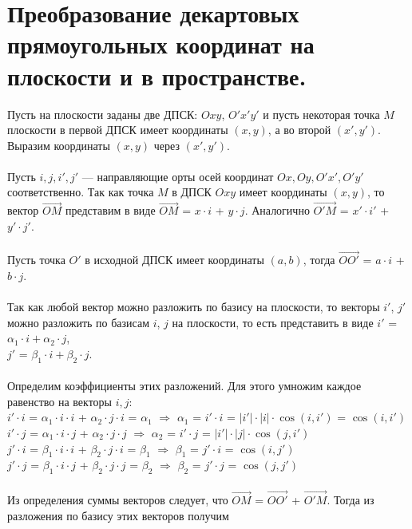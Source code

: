\section{Преобразование декартовых прямоугольных координат на плоскости и в пространстве.}
Пусть на плоскости заданы две ДПСК: $Oxy$, $O'x'y'$ и пусть некоторая точка $M$ плоскости в первой ДПСК имеет координаты $(x, y)$, а во второй $(x', y')$. Выразим координаты $(x, y)$ через $(x', y')$. \\\\Пусть $i, j, i', j'$ --- направляющие орты осей координат $Ox, Oy, O'x', O'y'$ соответственно. Так как точка $M$ в ДПСК $Oxy$ имеет координаты $(x, y)$, то вектор $\overrightarrow{OM}$ представим в виде $\overrightarrow{OM}$ = $x \cdot i$ + $y \cdot j$.
Аналогично $\overrightarrow{O' M}$ = $x' \cdot i'$ + $y' \cdot j'$. \\\\
Пусть точка $O'$ в исходной ДПСК имеет координаты $(a, b)$, тогда $\overrightarrow{O O'}$ = $a \cdot i$ + $b \cdot j$. \\\\
Так как любой вектор можно разложить по базису на плоскости, то векторы $i'$, $j'$ можно разложить по базисам $i$, $j$ на плоскости, то есть представить в виде $i'$ = $\alpha_1 \cdot i + \alpha_2 \cdot j$, \\ $j'$ = $\beta_1 \cdot i + \beta_2 \cdot j$. \\\\Определим коэффициенты этих разложений. Для этого умножим каждое равенство на векторы $i, j$: \\
$i'\cdot i$ = $\alpha_1 \cdot i \cdot i$ + $\alpha_2 \cdot j \cdot i$ = $\alpha_1$ $\Rightarrow$ $\alpha_1$ = $i' \cdot i$ = $|i'| \cdot |i| \cdot \cos(i, i')$ = $\cos(i, i')$ \\
$i' \cdot j$ = $\alpha_1 \cdot i \cdot j$ + $\alpha_2 \cdot j \cdot j$ $\Rightarrow$ $\alpha_2$ = $i' \cdot j$ = $|i'| \cdot |j| \cdot \cos(j, i')$ \\
$j' \cdot i$ = $\beta_1 \cdot i \cdot i$ + $\beta_2 \cdot j \cdot i$ = $\beta_1$ $\Rightarrow$ $\beta_1$ = $j' \cdot i$ =  $\cos(i, j')$ \\
$j' \cdot j$ = $\beta_1 \cdot i \cdot j$ + $\beta_2 \cdot j \cdot j$ = $\beta_2$ $\Rightarrow$ $\beta_2$ = $j' \cdot j$ =  $\cos(j, j')$ \\\\
Из определения суммы векторов следует, что
$\overrightarrow{OM}$ = $\overrightarrow{O O'}$ + $\overrightarrow{O' M}$. Тогда из разложения по базису этих векторов получим \\
